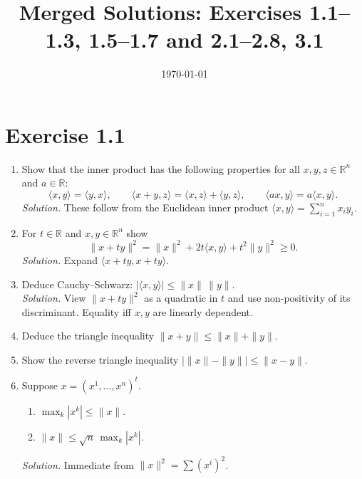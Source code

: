 \documentclass[11pt,a4paper]{article}
\title{Merged Solutions: Exercises 1.1--1.3, 1.5--1.7 and 2.1--2.8, 3.1}
\author{}
\date{\today}
\begin{document}
\maketitle

\section*{Exercise 1.1}
\begin{enumerate}
\renewcommand\labelenumi{(\alph{enumi})}
\item Show that the inner product has the following properties for all $x,y,z\in\mathbb{R}^n$ and $a\in\mathbb{R}$:
\[
\langle x,y\rangle=\langle y,x\rangle,\qquad
\langle x+y,z\rangle=\langle x,z\rangle+\langle y,z\rangle,\qquad
\langle ax,y\rangle=a\langle x,y\rangle.
\]
\textit{Solution.} These follow from the Euclidean inner product $\langle x,y\rangle=\sum_{i=1}^n x_i y_i$.

\item For $t\in\mathbb{R}$ and $x,y\in\mathbb{R}^n$ show
\[
\|x+ty\|^2=\|x\|^2+2t\langle x,y\rangle+t^2\|y\|^2\ge 0.
\]
\textit{Solution.} Expand $\langle x+ty,x+ty\rangle$.

\item Deduce Cauchy--Schwarz: $|\langle x,y\rangle|\le \|x\|\,\|y\|$.\\
\textit{Solution.} View $\|x+ty\|^2$ as a quadratic in $t$ and use non-positivity of its discriminant.
Equality iff $x,y$ are linearly dependent.

\item Deduce the triangle inequality $\|x+y\|\le \|x\|+\|y\|$.

\item Show the reverse triangle inequality $|\|x\|-\|y\||\le \|x-y\|$.

\item Suppose $x=(x^1,\dots,x^n)^t$.
\begin{enumerate}
\renewcommand\labelenumii{(\roman{enumii})}
\item $\displaystyle \max_{k}|x^k|\le \|x\|$.
\item $\displaystyle \|x\|\le \sqrt{n}\,\max_{k}|x^k|$.
\end{enumerate}
\textit{Solution.} Immediate from $\|x\|^2=\sum (x^i)^2$.
\end{enumerate}
\end{document}

